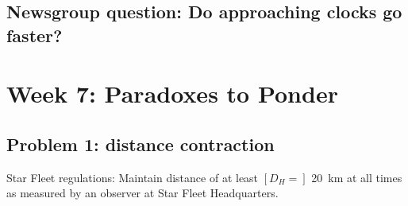 \documentclass[pagesize,headsepline,10pt,parskip=half]{scrreprt}
\begin{document}
    \section{Newsgroup question: Do approaching clocks go faster?}
      \begin{spacetimediagram}[Test]
        \plotlight{}
      \end{spacetimediagram}

  \chapter{Week 7: Paradoxes to Ponder}
    \section{Problem 1: distance contraction}
      Star Fleet regulations: Maintain distance of at least $[D_H =]$ \SI{20}{\kilo\meter} at all times
      as measured by an observer at Star Fleet Headquarters.
\end{document}
